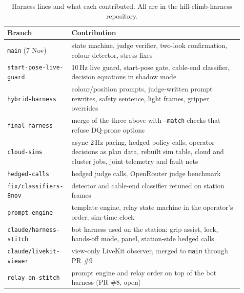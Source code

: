 \documentclass[10pt]{article}
\begin{document}
\begin{table}[t]
\centering
\small
\caption{Harness lines and what each contributed. All are in the hill-climb-harness repository.}
\label{tab:branches}
\begin{tabular}{@{}p{0.25\linewidth}p{0.71\linewidth}@{}}
\toprule
Branch & Contribution \\
\midrule
\texttt{main} (7 Nov) & state machine, judge verifier, two-look confirmation, colour detector, stress fixes \\
\texttt{start-pose-live-guard} & 10\,Hz live guard, start-pose gate, cable-end classifier, decision equations in shadow mode \\
\texttt{hybrid-harness} & colour/position prompts, judge-written prompt rewrites, safety sentence, light frames, gripper overrides \\
\texttt{final-harness} & merge of the three above with \texttt{--match} checks that refuse DQ-prone options \\
\texttt{cloud-sims} & async 2\,Hz pacing, hedged policy calls, operator decisions as plan data, rebuilt sim table, cloud and cluster jobs, joint telemetry and fault nets \\
\texttt{hedged-calls} & hedged judge calls, OpenRouter judge benchmark \\
\texttt{fix/classifiers-8nov} & detector and cable-end classifier retuned on station frames \\
\texttt{prompt-engine} & template engine, relay state machine in the operator's order, sim-time clock \\
\texttt{claude/harness-stitch} & bot harness used on the station: grip assist, lock, hands-off mode, panel, station-side hedged calls \\
\texttt{claude/livekit-viewer} & view-only LiveKit observer, merged to \texttt{main} through PR \#9 \\
\texttt{relay-on-stitch} & prompt engine and relay order on top of the bot harness (PR \#8, open) \\
\bottomrule
\end{tabular}
\end{table}
\end{document}
